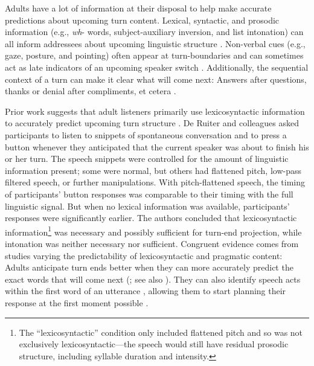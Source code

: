 \documentclass[authoryear, 12pt]{elsarticle}
\begin{document}
Adults have a lot of information at their disposal to help make accurate predictions about upcoming turn content. Lexical, syntactic, and prosodic information (e.g., \textit{wh}- words, subject-auxiliary inversion, and list intonation) can all inform addressees about upcoming linguistic structure \citep{de-ruiter2006, duncan1972, ford1996, torreira2015}. Non-verbal cues (e.g., gaze, posture, and pointing) often appear at turn-boundaries and can sometimes act as late indicators of an upcoming speaker switch \citep{rossano2009, stivers2010}. Additionally, the sequential context of a turn can make it clear what will come next: Answers after questions, thanks or denial after compliments, et cetera \citep{schegloff2007}.

Prior work suggests that adult listeners primarily use lexicosyntactic information to accurately predict upcoming turn structure \citep{de-ruiter2006}. De Ruiter and colleagues \citeyearpar{de-ruiter2006} asked participants to listen to snippets of spontaneous conversation and to press a button whenever they anticipated that the current speaker was about to finish his or her turn. The speech snippets were controlled for the amount of linguistic information present; some were normal, but others had flattened pitch, low-pass filtered speech, or further manipulations. With pitch-flattened speech, the timing of participants' button responses was comparable to their timing with the full linguistic signal. But when no lexical information was available, participants' responses were significantly earlier. The authors concluded that lexicosyntactic information\footnote{The ``lexicosyntactic'' condition only included flattened pitch and so was not exclusively lexicosyntactic---the speech would still have residual prosodic structure, including syllable duration and intensity.} was necessary and possibly sufficient for turn-end projection, while intonation was neither necessary nor sufficient. Congruent evidence comes from studies varying the predictability of lexicosyntactic and pragmatic content: Adults anticipate turn ends better when they can more accurately predict the exact words that will come next (\citealp{magyari2012}; see also \citealp{magyari2014}). They can also identify speech acts within the first word of an utterance \citep{gisladottir2015}, allowing them to start planning their response at the first moment possible \citep{bogels2015}.
\end{document}

